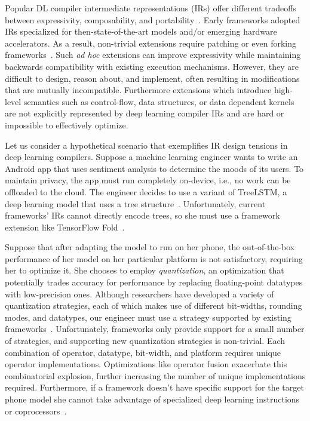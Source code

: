 Popular DL compiler intermediate representations (IRs) offer different tradeoffs
  between expressivity, composability, and portability~\citep{
    tensorflow, pytorch_ad, chainer_learningsys2015, tangent, theano, glow}.
Early frameworks adopted IRs
  specialized for then-state-of-the-art models and/or
  emerging hardware accelerators.
As a result, non-trivial extensions require
  patching or even forking frameworks~\citep{
    tf_fold, tf_lite, tangent, tf_eager, xla, glow, torchscript}.
Such \textit{ad hoc} extensions can improve expressivity
  while maintaining backwards compatibility with existing execution mechanisms.
However, they are difficult to design, reason about, and implement,
  often resulting in modifications that are mutually incompatible.
Furthermore extensions which introduce high-level semantics
  such as control-flow, data structures, or data dependent kernels
  are not explicitly represented by deep learning compiler IRs
  and are hard or impossible to effectively optimize.

Let us consider a hypothetical scenario that exemplifies
  IR design tensions in deep learning compilers.
Suppose a machine learning engineer wants to write
  an Android app that uses sentiment analysis to
  determine the moods of its users.
To maintain privacy, the app must run completely on-device,
  i.e., no work can be offloaded to the cloud.
The engineer decides to use a variant of TreeLSTM,
  a deep learning model that uses a tree structure~\citep{tree_lstm}.
Unfortunately, current frameworks' IRs cannot directly encode trees,
  so she must use a framework extension
  like TensorFlow Fold~\citep{tensorflowfold}.

Suppose that after adapting the model to run on her phone,
  the out-of-the-box performance of her
  model on her particular platform is not satisfactory, requiring her to optimize it.
She chooses to employ \textit{quantization}, an optimization that
  potentially trades accuracy for performance by replacing
  floating-point datatypes with low-precision ones.
Although researchers have developed a variety of quantization
  strategies, each of which makes use of different bit-widths, rounding
  modes, and datatypes, our engineer must use a strategy supported
  by existing frameworks~\citep{gustafson2015end, tf_lite_ops_compat, glow_quant}.
Unfortunately, frameworks only provide support for a small number
  of strategies, and supporting new quantization strategies is non-trivial.
Each combination of operator, datatype, bit-width, and
  platform requires unique operator implementations.
Optimizations like operator fusion exacerbate this combinatorial explosion,
  further increasing the number of unique implementations required.
Furthermore, if a framework doesn't have specific support for
  the target phone model she cannot take advantage of specialized deep learning
  instructions or coprocessors~\citep{apple_neural_engine}.

